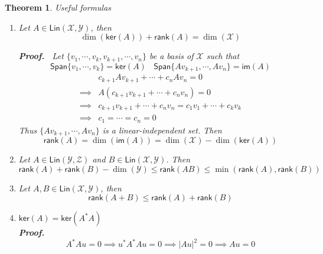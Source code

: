 \documentclass[aps,pra,onecolumn,notitlepage,superscriptaddress]{revtex4-1}
\newcommand{\spc}[1]{\mathcal{#1}}
\newcommand{\Span}{{\mathsf{Span}}}
\newcommand{\Lin}{\mathsf{Lin}}
\newcommand{\rank}{\mathsf{rank}}
\newcommand{\im}{\mathsf{im}}
\newcommand{\myker}{\mathsf{ker}}
\newtheorem{theo}{Theorem}
\def\Proof{{\bf Proof.~}}
\begin{document}
    \begin{theo}
        Useful formulas
        \begin{enumerate}
            \item Let $A \in \Lin(\spc X,\spc Y)$, then 
            \begin{equation}
                \dim(\myker(A)) + \rank(A) = \dim(\spc X)
            \end{equation}
            
            \Proof {
                Let $\{ v_1, \cdots, v_k, v_{k+1}, \cdots, v_n \}$ be a basis of $\spc X$ such that
                \begin{equation}
                    \Span \{ v_1, \cdots, v_k \} = \myker(A) \ \ \ \ \Span \{ Av_{k+1}, \cdots, Av_n \} = \im(A)
                \end{equation}
                \begin{align}
                    &c_{k+1}Av_{k+1} + \cdots + c_nAv_n = 0 \\
                    \implies& A(c_{k+1}v_{k+1} + \cdots + c_nv_n) = 0 \\
                    \implies& c_{k+1}v_{k+1} + \cdots + c_nv_n = c_1v_1 + \cdots + c_kv_k \\
                    \implies& c_1 = \cdots = c_n = 0
                \end{align}
                Thus $\{ Av_{k+1}, \cdots, Av_n \}$ is a linear-independent set. Then
                \begin{equation}
                    \rank(A) = \dim(\im(A)) = \dim(\spc X) - \dim(\myker(A))
                \end{equation}
            }
            \item Let $A \in \Lin(\spc Y,\spc Z)$ and $B \in \Lin(\spc X,\spc Y)$. Then
            \begin{equation}
                \rank(A)+\rank(B)-\dim(\spc Y) \leq \rank(AB) \leq \min( \rank(A), \rank(B) )
            \end{equation}
            \item Let $A,B \in \Lin(\spc X,\spc Y)$, then
            \begin{equation}
                \rank(A+B) \leq \rank(A)+\rank(B)
            \end{equation}
            \item $\myker(A) = \myker(A^*A)$
            \\\Proof {
                \begin{equation}
                    A^*Au = 0 \implies u^*A^*Au = 0 \implies |Au|^2 = 0 \implies Au = 0 

\end{equation}}
\end{enumerate}
\end{theo}
\end{document}
